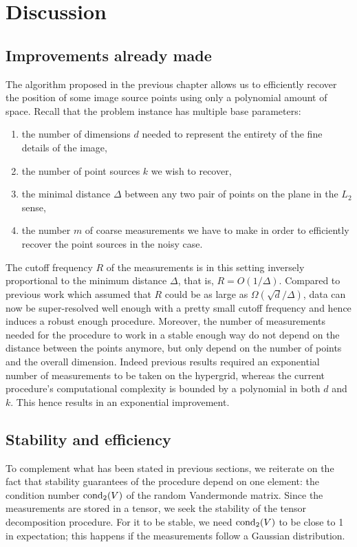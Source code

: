 \chapter{Discussion}
\section{Improvements already made}
The algorithm proposed in the previous chapter allows us to efficiently recover the position of some image source points using only a polynomial amount of space. Recall that the problem instance has multiple base parameters:
\begin{enumerate}
    \item the number of dimensions $d$ needed to represent the entirety of the fine details of the image,
    \item the number of point sources $k$ we wish to recover,
    \item the minimal distance $\Delta$ between any two pair of points on the plane in the $L_2$ sense,
    \item the number $m$ of coarse measurements we have to make in order to efficiently recover the point sources in the noisy case.
\end{enumerate}
The cutoff frequency $R$ of the measurements is in this setting inversely proportional to the minimum distance $\Delta$, that is, $R=O(1/\Delta)$. Compared to previous work which assumed that $R$ could be as large as $\Omega(\sqrt{d}/\Delta)$, data can now be super-resolved well enough with a pretty small cutoff frequency and hence induces a robust enough procedure. Moreover, the number of measurements needed for the procedure to work in a stable enough way do not depend on the distance between the points anymore, but only depend on the number of points and the overall dimension. Indeed previous results required an exponential number of measurements to be taken on the hypergrid, whereas the current procedure's computational complexity is bounded by a polynomial in both $d$ and $k$. This hence results in an exponential improvement.
\section{Stability and efficiency}
To complement what has been stated in previous sections, we reiterate on the fact that stability guarantees of the procedure depend on one element: the condition number $\operatorname*{cond_2}(V)$ of the random Vandermonde matrix. Since the measurements are stored in a tensor, we seek the stability of the tensor decomposition procedure. For it to be stable, we need $\operatorname*{cond_2}(V)$ to be close to 1 in expectation; this happens if the measurements follow a Gaussian distribution.
